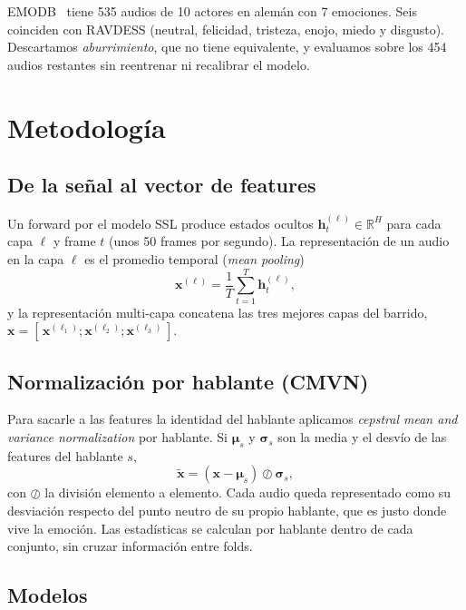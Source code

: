 \documentclass[conference]{IEEEtran}
\begin{document}
EMODB~\cite{emodb} tiene 535 audios de 10 actores en alemán con 7 emociones.
Seis coinciden con RAVDESS (neutral, felicidad, tristeza, enojo, miedo y
disgusto). Descartamos \emph{aburrimiento}, que no tiene equivalente, y
evaluamos sobre los 454 audios restantes sin reentrenar ni recalibrar el
modelo.

\section{Metodología}

\subsection{De la señal al vector de features}

Un forward por el modelo SSL produce estados ocultos
$\mathbf{h}_t^{(\ell)} \in \mathbb{R}^H$ para cada capa $\ell$ y frame $t$
(unos 50 frames por segundo). La representación de un audio en la capa
$\ell$ es el promedio temporal (\emph{mean pooling})
\begin{equation}
\mathbf{x}^{(\ell)} = \frac{1}{T} \sum_{t=1}^{T} \mathbf{h}_t^{(\ell)},
\end{equation}
y la representación multi-capa concatena las tres mejores capas del barrido,
$\mathbf{x} = [\,\mathbf{x}^{(\ell_1)};\mathbf{x}^{(\ell_2)};\mathbf{x}^{(\ell_3)}\,]$.

\subsection{Normalización por hablante (CMVN)}

Para sacarle a las features la identidad del hablante aplicamos
\emph{cepstral mean and variance normalization} por hablante. Si
$\boldsymbol{\mu}_s$ y $\boldsymbol{\sigma}_s$ son la media y el desvío de
las features del hablante $s$,
\begin{equation}
\tilde{\mathbf{x}} = (\mathbf{x} - \boldsymbol{\mu}_s) \oslash \boldsymbol{\sigma}_s ,
\end{equation}
con $\oslash$ la división elemento a elemento. Cada audio queda representado
como su desviación respecto del punto neutro de su propio hablante, que es
justo donde vive la emoción. Las estadísticas se calculan por hablante
dentro de cada conjunto, sin cruzar información entre folds.

\subsection{Modelos}
\end{document}
